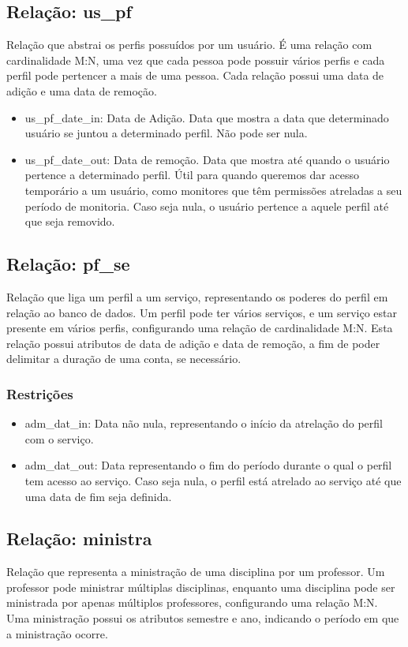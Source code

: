 \documentclass{article}
\begin{document}
  	\subsection{Relação: us\_pf}
  	    \quad Relação que abstrai os perfis possuídos por um usuário. É uma relação com cardinalidade M:N, uma vez que cada pessoa pode possuir vários perfis e cada perfil pode pertencer a mais de uma pessoa.
  	    \null \quad Cada relação possui uma data de adição e uma data de remoção.
  	    \begin{itemize}
  	        \item us\_pf\_date\_in: Data de Adição. Data que mostra a data que determinado usuário se juntou a determinado perfil. Não pode ser nula.
  	        \item us\_pf\_date\_out: Data de remoção. Data que mostra até quando o usuário pertence a determinado perfil. Útil para quando queremos dar acesso temporário a um usuário, como monitores que têm permissões atreladas a seu período de monitoria. Caso seja nula, o usuário pertence a aquele perfil até que seja removido.
  	    \end{itemize}
  	    
  	\subsection{Relação: pf\_se}
  	    \quad Relação que liga um perfil a um serviço, representando os poderes do perfil em relação ao banco de dados. Um perfil pode ter vários serviços, e um serviço estar presente em vários perfis, configurando uma relação de cardinalidade M:N.
  	    \null \quad Esta relação possui atributos de data de adição e data de remoção, a fim de poder delimitar a duração de uma conta, se necessário.
  	    \subsubsection{Restrições}
  	        \begin{itemize}
  	            \item adm\_dat\_in: Data não nula, representando o início da atrelação do perfil com o serviço.
  	            \item adm\_dat\_out: Data representando o fim do período durante o qual o perfil tem acesso ao serviço. Caso seja nula, o perfil está atrelado ao serviço até que uma data de fim seja definida.
  	        \end{itemize}
  	
  	\subsection{Relação: ministra}
  	    \quad Relação que representa a ministração de uma disciplina por um professor. Um professor pode ministrar múltiplas disciplinas, enquanto uma disciplina pode ser ministrada por apenas múltiplos professores, configurando uma relação M:N. \\
  	    \null \quad Uma ministração possui os atributos semestre e ano, indicando o período em que a ministração ocorre.
\end{document}
